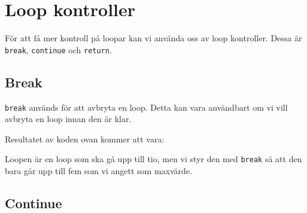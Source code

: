 \hypertarget{loop-kontroller}{%
\section{Loop kontroller}\label{loop-kontroller}}

För att få mer kontroll på loopar kan vi använda oss av loop kontroller.
Dessa är \texttt{break}, \texttt{continue} och \texttt{return}.

\hypertarget{break}{%
\subsection{Break}\label{break}}

\texttt{break} används för att avbryta en loop. Detta kan vara
användbart om vi vill avbryta en loop innan den är klar.

\hypertarget{cb1}{}
\begin{Shaded}
\begin{Highlighting}[]
\OperatorTok{=} \OperatorTok{;}
\OperatorTok{(}\OperatorTok{=} \OperatorTok{;}\OperatorTok{\textless{}} \OperatorTok{;}\OperatorTok{++)} \OperatorTok{\{}
    \OperatorTok{(}\OperatorTok{\textgreater{}=}\OperatorTok{)} \OperatorTok{\{}
        \OperatorTok{;}
    \OperatorTok{\}}
    \OperatorTok{(}\OperatorTok{);}
\OperatorTok{\}}
\end{Highlighting}
\end{Shaded}

Resultatet av koden ovan kommer att vara:

\begin{Shaded}
\begin{Highlighting}[]
\end{Highlighting}
\end{Shaded}

Loopen är en loop som ska gå upp till tio, men vi styr den med
\texttt{break} så att den bara går upp till fem som vi angett som
maxvärde.

\hypertarget{continue}{%
\subsection{Continue}\label{continue}}

